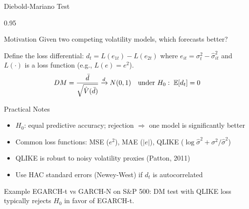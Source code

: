\documentclass[9pt, aspectratio=169, t]{beamer}
\begin{document}
\begin{frame}{Diebold-Mariano Test}
    \begin{cminipage}{0.95\textwidth}
    \scriptsize
    \setlength{\abovedisplayskip}{2pt}\setlength{\belowdisplayskip}{2pt}
    \vspace{-0.3cm}
    \begin{block}{Motivation}
        Given two competing volatility models, which forecasts better?
    \end{block}
    \vspace{-0.15cm}
    \begin{defn}
        Define the loss differential: $d_t = L(e_{1t}) - L(e_{2t})$
        where $e_{it} = \sigma_t^2 - \hat{\sigma}_{it}^2$ and $L(\cdot)$ is a loss function (e.g., $L(e) = e^2$).
        \[
            DM = \frac{\bar{d}}{\sqrt{\hat{V}(\bar{d})}} \xrightarrow{d} N(0,1) \quad \text{under } H_0: \; \mathbb{E}[d_t] = 0
        \]
    \end{defn}
    \vspace{-0.15cm}
    \begin{alertblock}{Practical Notes}
        \begin{itemize}\setlength{\itemsep}{0pt}
            \item $H_0$: equal predictive accuracy; rejection $\Rightarrow$ one model is significantly better
            \item Common loss functions: MSE ($e^2$), MAE ($|e|$), QLIKE ($\log \hat{\sigma}^2 + \sigma^2/\hat{\sigma}^2$)
            \item QLIKE is robust to noisy volatility proxies (Patton, 2011)
            \item Use HAC standard errors (Newey-West) if $d_t$ is autocorrelated
        \end{itemize}
    \end{alertblock}
    \begin{exampleblock}{Example}
        EGARCH-t vs GARCH-N on S\&P 500: DM test with QLIKE loss typically rejects $H_0$ in favor of EGARCH-t.
    \end{exampleblock}
    \end{cminipage}
\end{frame}
\end{document}
